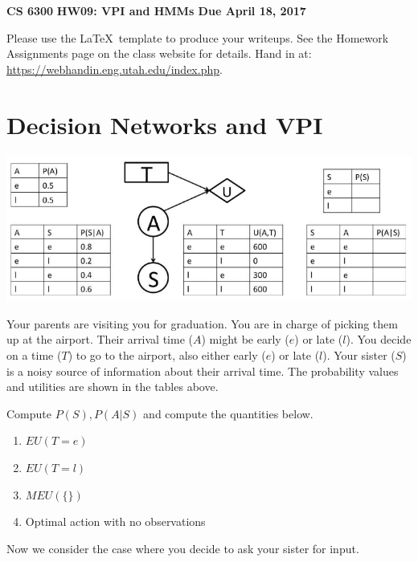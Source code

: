 \documentclass[12pt]{article}
\begin{document}
\begin{center}
{\bf CS 6300} \hfill {\large\bf HW09: VPI and HMMs \hfill Due April 18, 2017}
\end{center}

\noindent
Please use the \LaTeX\ template to produce your writeups. See the
Homework Assignments page on the class website for details.  Hand in
at: \url{https://webhandin.eng.utah.edu/index.php}.

\section{Decision Networks and VPI}

\begin{center}
\includegraphics[width=6in]{prob1.png}
\end{center}

Your parents are visiting you for graduation.  You are in charge of
picking them up at the airport.  Their arrival time ($A$) might be
early ($e$) or late ($l$).  You decide on a time ($T$) to go to the
airport, also either early ($e$) or late ($l$).  Your sister ($S$) is
a noisy source of information about their arrival time. The
probability values and utilities are shown in the tables above.

Compute $P(S), P(A|S)$ and compute the quantities below. 

\begin{enumerate}

\item $EU(T=e)$

\item $EU(T=l)$

\item $MEU( \{ \} )$

\item Optimal action with no observations

\end{enumerate}

\noindent
Now we consider the case where you decide to ask your sister for input.
\end{document}
